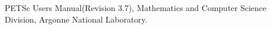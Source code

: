 \begin{thebibliography}{69}




 PETSc Users Manual(Revision 3.7), Mathematics and Computer Science Division, Argonne National Laboratory.




\end{thebibliography}
